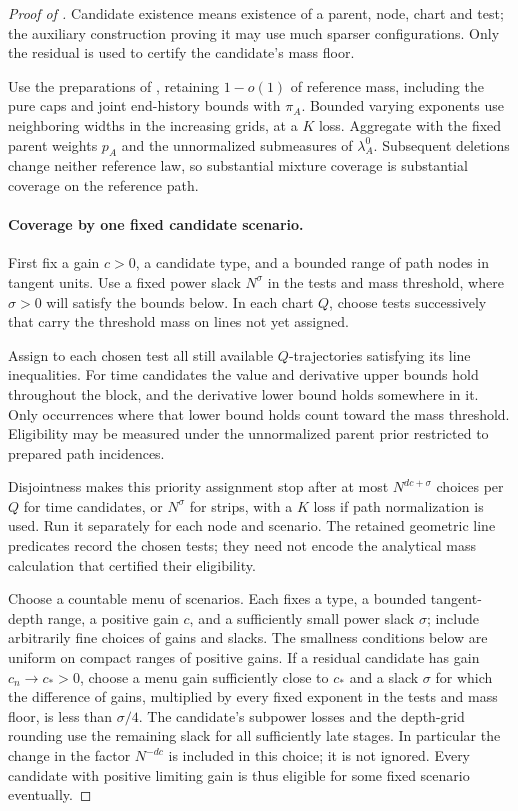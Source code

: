 \begin{proof}[Proof of ]
Candidate existence means existence of a parent, node, chart and test;
the auxiliary construction proving it may use much sparser
configurations.  Only the residual is used to certify the candidate's
mass floor.

Use the preparations of
, retaining
\(1-o(1)\) of reference mass, including the pure caps and joint
end-history bounds with \(\pi_A\).  Bounded varying exponents use
neighboring widths in the increasing grids, at a \(K\) loss.
Aggregate with the fixed parent weights \(p_A\) and the unnormalized
submeasures of \(\lambda_A^0\).  Subsequent deletions change neither
reference law, so substantial mixture coverage is substantial
coverage on the reference path.

\paragraph{Coverage by one fixed candidate scenario.}
First fix a gain \(c>0\), a candidate type, and a bounded range
of path nodes in tangent units.  Use a fixed power slack
\(N^\sigma\) in the tests and mass threshold, where \(\sigma>0\)
will satisfy the bounds below.  In each chart \(Q\), choose
tests successively that carry the threshold mass on lines not
yet assigned.

Assign to each chosen test all still available \(Q\)-trajectories
satisfying its line inequalities.  For time candidates the value
and derivative upper bounds hold throughout the block, and the
derivative lower bound holds somewhere in it.  Only occurrences
where that lower bound holds count toward the mass threshold.
Eligibility may be measured under the unnormalized parent prior
restricted to prepared path incidences.

Disjointness makes this priority assignment stop after at most
\(N^{dc+\sigma}\) choices per \(Q\) for time candidates, or
\(N^\sigma\) for strips, with a \(K\) loss if path normalization
is used.  Run it separately for each node and scenario.
The retained geometric line predicates record the chosen tests;
they need not encode the analytical mass calculation that certified
their eligibility.


Choose a countable menu of scenarios.  Each fixes a type, a bounded
tangent-depth range, a positive gain \(c\), and a sufficiently small
power slack \(\sigma\); include arbitrarily fine choices of gains and
slacks.  The smallness conditions below are uniform on compact ranges
of positive gains.  If a residual candidate has gain \(c_n\to c_*>0\),
choose a menu gain sufficiently close to \(c_*\) and a slack \(\sigma\)
for which the difference of gains, multiplied by every fixed exponent
in the tests and mass floor, is less than \(\sigma/4\).  The candidate's
subpower losses and the depth-grid rounding use the remaining slack
for all sufficiently late stages.  In particular the change in the
factor \(N^{-dc}\) is included in this choice; it is not ignored.
Every candidate with positive limiting gain is thus eligible for
some fixed scenario eventually.


\end{proof}
